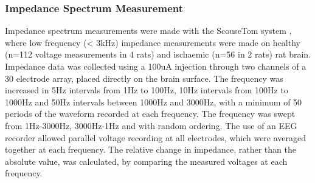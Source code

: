 \subsubsection{Impedance Spectrum Measurement}

Impedance spectrum measurements were made with the ScouseTom system \cite{Dowrick_2015}, where low frequency (< 3kHz) impedance measurements were made on healthy (n=112 voltage measurements in 4 rats) and ischaemic (n=56 in 2 rats) rat brain. Impedance data was collected using a 100uA injection through two channels of a 30 electrode array, placed directly on the brain surface. The frequency was increased in 5Hz intervals from 1Hz to 100Hz, 10Hz intervals from 100Hz to 1000Hz and 50Hz intervals between 1000Hz and 3000Hz, with a minimum of 50 periods of the waveform recorded at each frequency. The frequency was swept from 1Hz-3000Hz, 3000Hz-1Hz and with random ordering. The use of an EEG recorder allowed parallel voltage recording at all electrodes, which were averaged together at each frequency. The relative change in impedance, rather than the absolute value, was calculated, by comparing the measured voltages at each frequency.
